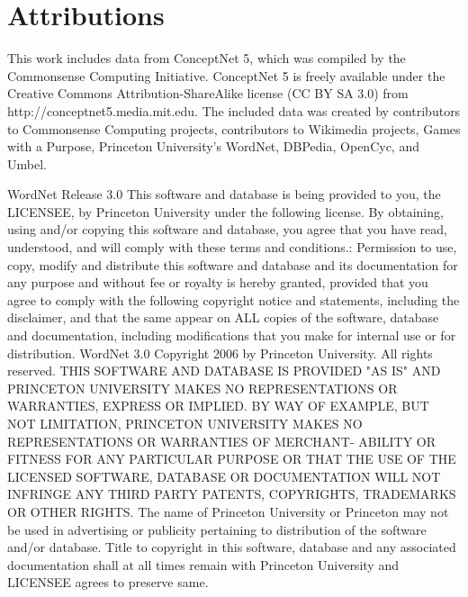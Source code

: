 \documentclass[12pt]{book}
\begin{document}
\backmatter
\printindex

\chapter{Attributions}

This work includes data from ConceptNet 5, which was compiled by the
Commonsense Computing Initiative. ConceptNet 5 is freely available under the
Creative Commons Attribution-ShareAlike license (CC BY SA 3.0) from
http://conceptnet5.media.mit.edu. The included data was created by contributors
to Commonsense Computing projects, contributors to Wikimedia projects, Games
with a Purpose, Princeton University's WordNet, DBPedia, OpenCyc, and Umbel.

WordNet Release 3.0 This software and database is being provided to you, the
LICENSEE, by Princeton University under the following license. By obtaining,
using and/or copying this software and database, you agree that you have read,
understood, and will comply with these terms and conditions.: Permission to
use, copy, modify and distribute this software and database and its
documentation for any purpose and without fee or royalty is hereby granted,
provided that you agree to comply with the following copyright notice and
statements, including the disclaimer, and that the same appear on ALL copies of
the software, database and documentation, including modifications that you make
for internal use or for distribution. WordNet 3.0 Copyright 2006 by Princeton
University. All rights reserved. THIS SOFTWARE AND DATABASE IS PROVIDED "AS IS"
AND PRINCETON UNIVERSITY MAKES NO REPRESENTATIONS OR WARRANTIES, EXPRESS OR
IMPLIED. BY WAY OF EXAMPLE, BUT NOT LIMITATION, PRINCETON UNIVERSITY MAKES NO
REPRESENTATIONS OR WARRANTIES OF MERCHANT- ABILITY OR FITNESS FOR ANY
PARTICULAR PURPOSE OR THAT THE USE OF THE LICENSED SOFTWARE, DATABASE OR
DOCUMENTATION WILL NOT INFRINGE ANY THIRD PARTY PATENTS, COPYRIGHTS, TRADEMARKS
OR OTHER RIGHTS. The name of Princeton University or Princeton may not be used
in advertising or publicity pertaining to distribution of the software and/or
database. Title to copyright in this software, database and any associated
documentation shall at all times remain with Princeton University and LICENSEE
agrees to preserve same.
\end{document}
